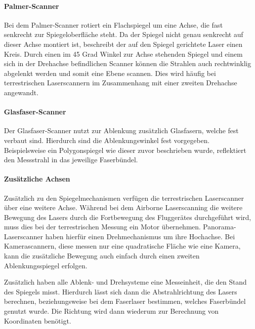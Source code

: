 \documentclass[a4paper,12pt,bibliography=totoc, listof=totoc,titlepage,pointlessnumbers]{scrreprt}
\begin{document}
\paragraph{Palmer-Scanner}
Bei dem Palmer-Scanner rotiert ein Flachspiegel um eine Achse, die fast senkrecht zur Spiegeloberfläche steht. Da der Spiegel nicht genau senkrecht auf dieser Achse montiert ist, beschreibt der auf den Spiegel gerichtete Laser einen Kreis. Durch einen im 45 Grad Winkel zur Achse stehenden Spiegel und einem sich in der Drehachse befindlichen Scanner können die Strahlen auch rechtwinklig abgelenkt werden und somit eine Ebene scannen. Dies wird häufig bei terrestrischen Laser\-scan\-nern im Zusammenhang mit einer zweiten Drehachse angewandt.

\paragraph{Glasfaser-Scanner}
\label{p:faserscanner}
Der Glasfaser-Scanner nutzt zur Ablenkung zusätzlich Glasfasern, welche fest verbaut sind. Hierdurch sind die Ablenkungswinkel fest vorgegeben. Beispielsweise ein Polygonspiegel wie dieser zuvor beschrieben wurde, reflektiert den Messstrahl in das jeweilige Faserbündel. 

\paragraph{Zusätzliche Achsen}
Zusätzlich zu den Spiegelmechanismen verfügen die terrestrischen Laser\-scan\-ner über eine weitere Achse. Während bei dem Air\-borne Laser\-scan\-ning die weitere Bewegung des Lasers durch die Fortbewegung des Fluggerätes durchgeführt wird, muss dies bei der terrestrischen Messung ein Motor übernehmen. Panorama-Laser\-scan\-ner haben hierfür einen Drehmechanismus um ihre Hochachse. Bei Kamera\-scannern, diese messen nur eine quadratische Fläche wie eine Kamera, kann die zusätzliche Bewegung auch einfach durch einen zweiten Ablenkungsspiegel erfolgen. \citep[S. 37]{beraldin}

Zusätzlich haben alle Ablenk- und Drehsysteme eine Messeinheit, die den Stand des Spiegels misst. Hierdurch lässt sich dann die Abstrahlrichtung des Lasers berechnen, beziehungsweise bei dem Faserlaser bestimmen, welches Faserbündel genutzt wurde. Die Richtung wird dann wiederum zur Berechnung von Koordinaten benötigt.
\end{document}
